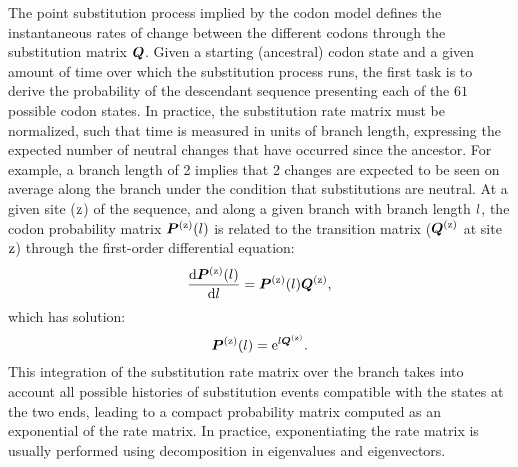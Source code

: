 The point \gls{substitution} process implied by the \gls{codon} model defines the instantaneous rates of change between the different \glspl{codon} through the \gls{substitution} matrix $\bm{Q}$.
Given a starting (ancestral) \gls{codon} state and a given amount of time over which the \gls{substitution} process runs, the first task is to derive the probability of the descendant sequence presenting each of the $61$ possible \gls{codon} states.
In practice, the \gls{substitution} rate matrix must be normalized, such that time is measured in units of branch length, expressing the expected number of \gls{neutral} changes that have occurred since the ancestor.
For example, a branch length of 2 implies that 2 changes are expected to be seen on average along the branch under the condition that \glspl{substitution} are \gls{neutral}.
At a given site ($\text{z}$) of the sequence, and along a given branch with branch length $l$, the \gls{codon} probability matrix $\bm{P}^{(\text{z})}(l)$ is related to the transition matrix ($\bm{Q}^{(\text{z})}$ at site $\text{z}$) through the first-order differential equation:
\begin{equation}
    \dfrac{\mathrm{d} \bm{P}^{(\text{z})}(l)}{\mathrm{d} l} = \bm{P}^{(\text{z})}(l) \bm{Q}^{(\text{z})},
\end{equation}
which has solution:
\begin{equation}
    \bm{P}^{(\text{z})}(l) = \text{e}^{l \bm{Q}^{(\text{z})}}.
\end{equation}
This integration of the \gls{substitution} rate matrix over the branch takes into account all possible histories of \gls{substitution} events compatible with the states at the two ends, leading to a compact probability matrix computed as an exponential of the rate matrix.
In practice, exponentiating the rate matrix is usually performed using decomposition in eigenvalues and eigenvectors.

